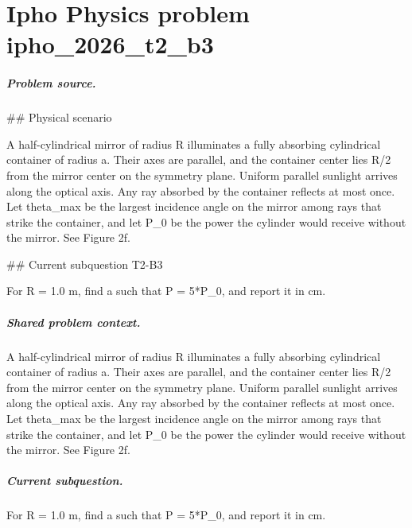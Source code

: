
\chapter{Ipho Physics problem ipho\_2026\_t2\_b3}
\label{ch:IPhO2026Problems_problem_ipho_2026_t2_b3}

\paragraph{Problem source.}
\#\# Physical scenario

A half-cylindrical mirror of radius R illuminates a fully absorbing cylindrical
container of radius a.  Their axes are parallel, and the container center lies
R/2 from the mirror center on the symmetry plane.  Uniform parallel sunlight
arrives along the optical axis.  Any ray absorbed by the container reflects at
most once.  Let theta\_max be the largest incidence angle on the mirror among
rays that strike the container, and let P\_0 be the power the cylinder would
receive without the mirror.  See Figure 2f.

\#\# Current subquestion T2-B3

For R = 1.0 m, find a such that P = 5*P\_0, and report it in cm.

\paragraph{Shared problem context.}
A half-cylindrical mirror of radius R illuminates a fully absorbing cylindrical
container of radius a.  Their axes are parallel, and the container center lies
R/2 from the mirror center on the symmetry plane.  Uniform parallel sunlight
arrives along the optical axis.  Any ray absorbed by the container reflects at
most once.  Let theta\_max be the largest incidence angle on the mirror among
rays that strike the container, and let P\_0 be the power the cylinder would
receive without the mirror.  See Figure 2f.

\paragraph{Current subquestion.}
For R = 1.0 m, find a such that P = 5*P\_0, and report it in cm.

